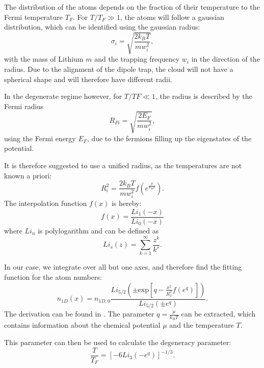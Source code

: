 The distribution of the atoms depends on the fraction of their temperature to the Fermi temperature\cite{Ketterle2008} $T_F$. For $T/T_F \gg 1$, the atoms will follow a gaussian distribution, which can be identified using the gaussian radius:
\begin{equation}
\sigma _i = \sqrt{\frac{2k_BT}{mw_i^2}},
\end{equation}
with the mass of Lithium $m$ and the trapping frequency $w_i$ in the direction of the radius. Due to the alignment of the dipole trap, the cloud will not have a spherical shape and will therefore have different radii.

In the degenerate regime however, for $T/TF \ll 1$, the radius is described by the Fermi radius
\begin{equation}
R_{Fi} = \sqrt{\frac{2E_F}{mw_i^2}},
\end{equation}
using the Fermi energy $E_F$, due to the fermions filling up the eigenstates of the potential.

It is therefore suggested\cite{Ketterle2008} to use a unified radius, as the temperatures are not known a priori:
\begin{equation}
R_i^2 = \frac{2k_BT}{mw_i^2}f( e^{\frac{\mu}{k_BT}}).
\end{equation}
The interpolation function $f(x)$ is hereby:
\begin{equation}
f(x) = \frac{Li_1(-x)}{Li_0(-x)}
\end{equation}
where $Li_n$ is polylogarithm and can be defined as
\begin{equation}
Li_s(z) = \sum_{k=1}^{\infty} \frac{z^k}{k^s}.
\end{equation}

In our case, we integrate over all but one axes, and therefore find the fitting function for the atom numbers:
\begin{equation}
\label{eq:n1d}
n_{1D}(x) = n_{1D,0}\frac{Li_{5/2}\left( \pm \mathrm{exp}\left[ q-\frac{x^2}{R_x^2}f(e^q)\right] \right)}{Li_{5/2}(\pm e^q)}.
\end{equation}
The derivation can be found in \cite{Ketterle2008}. The parameter $q=\frac{\mu}{k_BT}$ can be extracted, which contains information about the chemical potential $\mu$ and the temperature $T$.

This parameter can then be used to calculate the degeneracy parameter:
\begin{equation}
\label{eq:tovertf}
\frac{T}{T_F} = \left[ -6 Li_3(-e^q) \right]^{-1/3}.
\end{equation}

